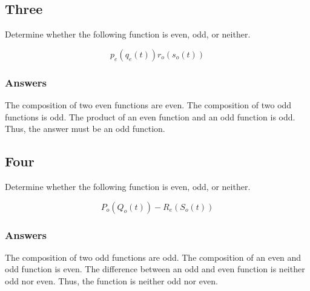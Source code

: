 \documentclass{article}
\begin{document}
\subsection*{Three}

Determine whether the following function is even, odd, or neither.

$$p_e\left(q_e\left(t\right)\right)r_o\left(s_o\left(t\right)\right)$$
\subsubsection*{Answers}

The composition of two even functions are even. The composition of two odd functions is odd. The product of an even function and an odd function is odd.
Thus, the answer must be an odd function.

\subsection*{Four}

Determine whether the following function is even, odd, or neither.

$$ P_o\left(Q_o\left(t\right)\right)-R_e\left(S_o\left(t\right)\right) $$

\subsubsection*{Answers}

The composition of two odd functions are odd. The composition of an even and odd function is even. The difference between an odd and even function is neither odd nor even. Thus, the function is neither odd nor even.
\end{document}
